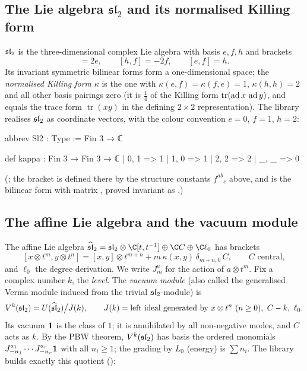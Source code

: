 \subsection{The Lie algebra \texorpdfstring{$\mathfrak{sl}_2$}{sl(2)} and its normalised Killing form}

$\mathfrak{sl}_2$ is the three-dimensional complex Lie algebra with basis $e,f,h$ and brackets
\begin{equation*}
  [h,e] = 2e,\qquad [h,f] = -2f,\qquad [e,f] = h .
\end{equation*}
Its invariant symmetric bilinear forms form a one-dimensional space; the \emph{normalised Killing
form} $\kappa$ is the one with $\kappa(e,f) = \kappa(f,e) = 1$, $\kappa(h,h) = 2$ and all other basis
pairings zero (it is $\tfrac14$ of the Killing form $\operatorname{tr}(\operatorname{ad} x\,\operatorname{ad} y)$, and
equals the trace form $\operatorname{tr}(xy)$ in the defining $2\times 2$ representation). The
library realises $\mathfrak{sl}_2$ as coordinate vectors, with the colour convention $e=0$, $f=1$, $h=2$:

\begin{leancode}
abbrev Sl2 : Type := Fin 3 → ℂ
\end{leancode}
\begin{leancode}
def kappa : Fin 3 → Fin 3 → ℂ
  | 0, 1 => 1
  | 1, 0 => 1
  | 2, 2 => 2
  | _, _ => 0
\end{leancode}
(; the bracket is defined there by the structure constants
$f^{ab}{}_c$ above, and  is the bilinear form with matrix , proved
invariant as .)

\subsection{The affine Lie algebra and the vacuum module}

The affine Lie algebra $\lninehat = \lninesl\otimes\C[t,t^{-1}] \oplus \C C \oplus \C\ell_0$ has
brackets
\begin{equation}\label{l09:eq:affinebracket}
  [x\otimes t^m, y\otimes t^n] = [x,y]\otimes t^{m+n} + m\,\kappa(x,y)\,\delta_{m+n,0}\,C,
  \qquad C \text{ central},
\end{equation}
and $\ell_0$ the degree derivation. We write $J^a_m$ for the action of $a\otimes t^m$. Fix a complex
number $k$, the \emph{level}. The \emph{vacuum module} (also called the generalised Verma module
induced from the trivial $\mathfrak{sl}_2$-module) is
\begin{equation*}
  V^k(\mathfrak{sl}_2) = U(\widehat{\mathfrak{sl}}_2)\big/ J(k),\qquad
  J(k) = \text{left ideal generated by } x\otimes t^n\ (n\ge 0),\ C - k,\ \ell_0 .
\end{equation*}
Its vacuum $\mathbf{1}$ is the class of $1$; it is annihilated by all non-negative modes, and $C$
acts as $k$. By the PBW theorem, $V^k(\mathfrak{sl}_2)$ has basis the ordered monomials
$J^{a_1}_{-n_1}\cdots J^{a_r}_{-n_r}\mathbf{1}$ with all $n_i\ge 1$; the grading by $L_0$ (energy) is
$\sum n_i$. The library builds exactly this quotient ():

